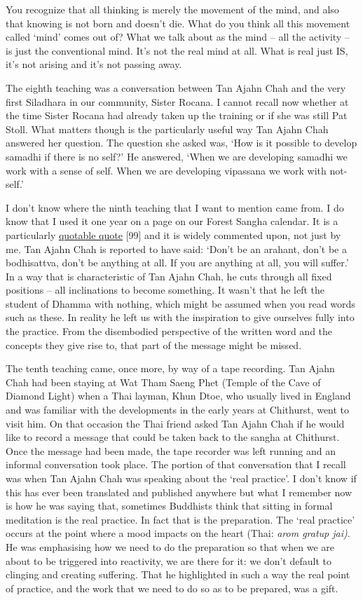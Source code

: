 You recognize that all thinking is merely the movement of the mind, and
also that knowing is not born and doesn't die. What do you think all
this movement called `mind' comes out of? What we talk about as the mind
-- all the activity -- is just the conventional mind. It's not the real
mind at all. What is real just IS, it's not arising and it's not passing
away.

The eighth teaching was a conversation between Tan Ajahn Chah and the
very first Siladhara in our community, Sister Rocana. I cannot recall
now whether at the time Sister Rocana had already taken up the training
or if she was still Pat Stoll. What matters though is the particularly
useful way Tan Ajahn Chah answered her question. The question she asked
was, `How is it possible to develop samadhi if there is no self?' He
answered, `When we are developing samadhi we work with a sense of self.
When we are developing vipassana we work with not-self.'

I don't know where the ninth teaching that I want to mention came from.
I do know that I used it one year on a page on our Forest Sangha
calendar. It is a particularly
\href{https://www.amaravati.org/the-view-from-the-centre/}{\underline{quotable
quote}} {[}99{]} and it is widely commented upon, not just by me. Tan
Ajahn Chah is reported to have said: `Don't be an arahant, don't be a
bodhisattva, don't be anything at all. If you are anything at all, you
will suffer.' In a way that is characteristic of Tan Ajahn Chah, he cuts
through all fixed positions -- all inclinations to become something. It
wasn't that he left the student of Dhamma with nothing, which might be
assumed when you read words such as these. In reality he left us with
the inspiration to give ourselves fully into the practice. From the
disembodied perspective of the written word and the concepts they give
rise to, that part of the message might be missed.

The tenth teaching came, once more, by way of a tape recording. Tan
Ajahn Chah had been staying at Wat Tham Saeng Phet (Temple of the Cave
of Diamond Light) when a Thai layman, Khun Dtoe, who usually lived in
England and was familiar with the developments in the early years at
Chithurst, went to visit him. On that occasion the Thai friend asked Tan
Ajahn Chah if he would like to record a message that could be taken back
to the sangha at Chithurst. Once the message had been made, the tape
recorder was left running and an informal conversation took place. The
portion of that conversation that I recall was when Tan Ajahn Chah was
speaking about the `real practice'. I don't know if this has ever been
translated and published anywhere but what I remember now is how he was
saying that, sometimes Buddhists think that sitting in formal meditation
is the real practice. In fact that is the preparation. The `real
practice' occurs at the point where a mood impacts on the heart (Thai:
\emph{arom gratup jai)}. He was emphasising how we need to do the
preparation so that when we are about to be triggered into reactivity,
we are there for it: we don't default to clinging and creating
suffering. That he highlighted in such a way the real point of practice,
and the work that we need to do so as to be prepared, was a gift.

